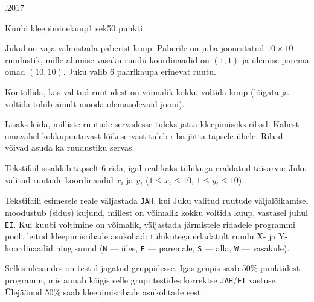 \documentclass[a4paper,11pt]{article}
\begin{document}
\begin{ol}{\eio}{.2017}{\yle}{}
\begin{yl}{4}{Kuubi kleepimine}{kuup}{1 sek}{50 punkti}

Jukul on vaja valmistada paberist kuup. Paberile on juba joonestatud $10 \times 10$ ruudustik, mille alumise vasaku ruudu koordinaadid on $(1,1)$ ja ülemise parema omad $(10,10)$. Juku valib 6 paarikaupa erinevat ruutu.

Kontollida, kas valitud ruutudest on võimalik kokku voltida kuup (lõigata ja voltida tohib ainult mööda olemasolevaid jooni).

Lisaks leida, milliste ruutude servadesse tuleks jätta kleepimiseks ribad. Kahest omavahel kokkupuutuvast lõikeservast tuleb riba jätta täpsele ühele. Ribad võivad asuda ka ruudustiku servas.

\sis Tekstifail \sisf sisaldab täpselt 6 rida, igal real kaks tühikuga eraldatud täisarvu: Juku valitud ruutude koordinaadid $x_i$ ja $y_i$ ($1 \le x_i \le 10$, $1 \le y_i \le 10$).

\val Tekstifaili \valf esimesele reale väljastada \verb'JAH', kui Juku valitud ruutude välja\-lõikamisel moodustub (sidus) kujund, millest on võimalik kokku voltida kuup, vastasel juhul \verb'EI'. Kui kuubi voltimine on võimalik, väljastada järmistele ridadele programmi poolt leitud kleepimis\-ribade asukohad: tühikutega erladatult ruudu X- ja Y-koordinaadid ning suund (\verb'N' --- üles, \verb'E' --- paremale, \verb'S' --- alla, \verb'W' --- vasakule).

\begin{wrapfigure}{r}{0.3\textwidth}
\vspace{-10pt}
\vspace{+10pt}
\vspace{-10pt}
\end{wrapfigure}

\nde[0]{3cm}{3cm}

\nde[1]{3cm}{3cm}

\hnd Selles ülesandes on testid jagatud gruppidesse. Igas grupis saab 50\% punktidest programm, mis annab kõigis selle grupi testides korrektse \verb'JAH'/\verb'EI' vastuse. Ülejäänud 50\% saab kleepimis\-ribade asukohtade eest.

\end{yl}
\end{ol}
\end{document}
